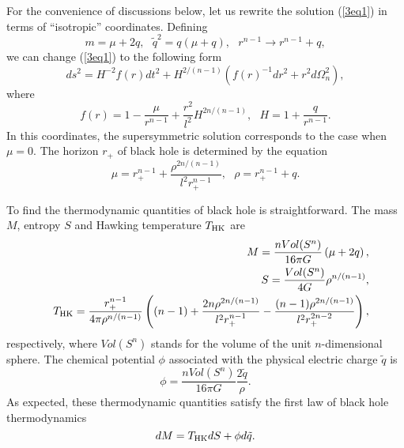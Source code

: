 \documentclass[a4paper,12pt]{article}
\begin{document}
For the convenience of discussions below, let us rewrite the solution 
(\ref{3eq1}) in terms of ``isotropic'' coordinates. Defining 
\begin{equation}
m = \mu + 2q, \ \ \  \tilde q^2 =q(\mu +q), \ \ \ r^{n-1} \to r^{n-1}+q,
\end{equation}
we can change (\ref{3eq1}) to the following form   
\begin{equation}
\label{req5}
ds^2 = H^{-2} f(r) dt^2 + H^{2/(n-1)}(f(r)^{-1}dr^2 +r^2 d\Omega_n^2),
\end{equation}
where 
\begin{equation}
f(r) = 1-\frac{\mu}{r^{n-1}} +\frac{r^2}{l^2}H^{2n/(n-1)}, \ \ \
  H=1+\frac{q}{r^{n-1}}.
\end{equation}
In this coordinates, the supersymmetric solution corresponds to the case 
when $\mu =0$.  The horizon $r_+$ of black hole is determined by the equation
\begin{equation}
 \mu = r_+^{n-1} +\frac{\rho ^{2n/(n-1)}}{l^2 r_+^{n-1}}, \ \ \ 
 \rho =r_+^{n-1} +q.
\end{equation}

To find the thermodynamic quantities of black hole is straightforward. The 
mass $M$, entropy $S$ and Hawking temperature $T_{\rm HK}$ are
\begin{eqnarray}
\label{req8}
&& M =\frac{n Vol(S^n)}{16\pi G}\left (\mu +2 q \right), \nonumber \\
&& S =\frac{Vol(S^n)}{4G}\rho ^{n/(n-1)}, \nonumber \\
&& T_{\rm HK}= \frac{r_+^{n-1}}{4\pi \rho^{n/(n-1)}}\left ( (n-1)
   +\frac{2n \rho^{2n/(n-1)}}{l^2 r_+^{n-1}} -\frac{(n-1)\rho^{2n/(n-1)}}
   {l^2 r_+^{2n-2}}\right), 
\end{eqnarray}
respectively, where $Vol(S^n)$ stands for the volume of the unit 
$n$-dimensional sphere. The chemical potential $\phi$ associated with the 
physical electric charge $\tilde q$ is 
\begin{equation}
\phi =\frac{n Vol(S^n)}{16\pi G}\frac{2\tilde q}{\rho}.
\end{equation}
As expected, these thermodynamic quantities satisfy the first law of black
hole thermodynamics
\begin{equation}
dM = T_{\rm HK} dS +\phi d\tilde q.
\end{equation}
 
\end{document}
